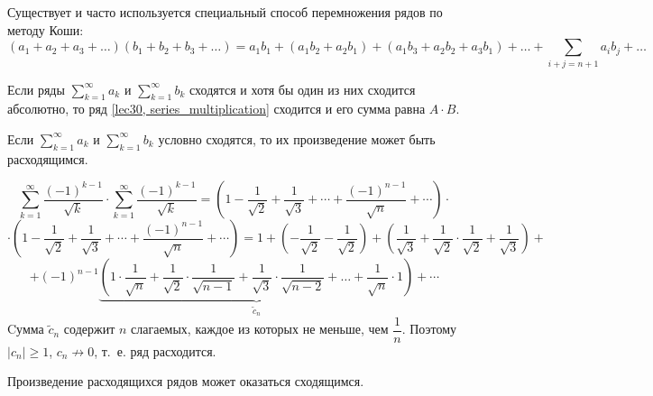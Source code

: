 \documentclass[../../main.tex]{subfiles}
\begin{document}
Существует и часто используется специальный способ перемножения рядов по 
методу Коши:
\[(a_1 + a_2 + a_3 + \ldots)(b_1 + b_2 + b_3 + \ldots) = a_1 b_1 +
(a_1 b_2 + a_2 b_1) + (a_1 b_3 + a_2 b_2 + a_3 b_1) + \ldots +
\sum\limits_{i + j = n + 1} a_i b_j + \ldots\]
\begin{thm}[Мертенс]
Если ряды $\sum\limits_{k = 1}^{\infty} a_k$ и
$\sum\limits_{k = 1}^{\infty} b_k$ сходятся и хотя бы один из них
сходится абсолютно, то ряд \eqref{lec30, series_multiplication} сходится
и его сумма равна $A \cdot B$.
\end{thm}

Если $\sum\limits_{k = 1}^{\infty} a_k$ и
$\sum\limits_{k = 1}^{\infty} b_k$ условно сходятся, то их произведение
может быть расходящимся.
\begin{example}
	\[\sum\limits_{k = 1}^{\infty} \frac{(-1)^{k-1}}{\sqrt{k}} \cdot
	\sum\limits_{k = 1}^{\infty} \frac{(-1)^{k-1}}{\sqrt{k}} =
	\left(1 - \frac{1}{\sqrt{2}} + \frac{1}{\sqrt{3}} + \cdots +
	\frac{(-1)^{n-1}}{\sqrt{n}} + \cdots \right) \cdot \]
	\[\cdot \left(1 - \frac{1}{\sqrt{2}} + \frac{1}{\sqrt{3}} + \cdots +
	\frac{(-1)^{n-1}}{\sqrt{n}} + \cdots \right) = 1 +
	\left( - \frac{1}{\sqrt{2}} - \frac{1}{\sqrt{2}} \right) +
	\left( \frac{1}{\sqrt{3}} + \frac{1}{\sqrt{2}} \cdot
	\frac{1}{\sqrt{2}} + \frac{1}{\sqrt{3}} \right) + \] 
	\[ + \left( -1 \right) ^ {n - 1}
	\underbrace{\left(1 \cdot \frac{1}{\sqrt{n}} + \frac{1}{\sqrt{2}} \cdot
	\frac{1}{\sqrt{n - 1}} + \frac{1}{\sqrt{3}} \cdot
	\frac{1}{\sqrt{n - 2}} + \ldots + \frac{1}{\sqrt{n}}
	\cdot 1\right)}_{\widetilde{c}_n} + \cdots \]
	Cумма $\widetilde{c}_n$ содержит $n$ слагаемых, каждое из которых не меньше,
	чем $\dfrac{1}{n}$. Поэтому $|c_n| \geq 1$, $c_n \not\to 0$, т.~е.
	ряд расходится.
\end{example}
\begin{remark}
	Произведение расходящихся рядов может оказаться сходящимся.
\end{remark}
\end{document}
